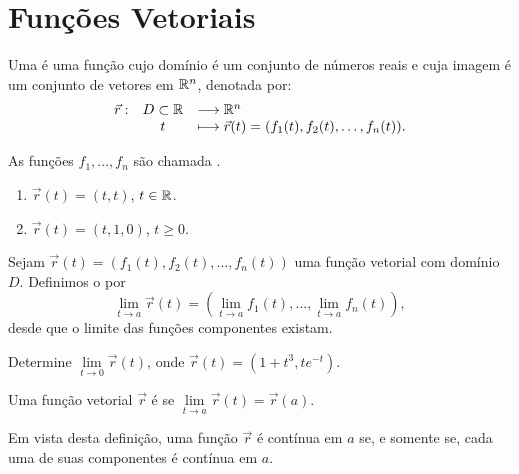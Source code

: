 \section{Funções Vetoriais}

\begin{definb}{}{}
Uma  é uma função cujo domínio é um conjunto de números reais e cuja imagem é um conjunto de vetores em $\mathbb{R}^n$, denotada por:
\[\begin{array}{lcl}
\vec{r}: & D\subset \mathbb{R} &  \longrightarrow \mathbb{R}^n\\
         & t           & \longmapsto \vec{r}(t)=(f_1(t),f_2(t),\ldots,f_n(t)).
\end{array}\]

As funções $f_1,\ldots,f_n$ são chamada .
\end{definb}

\begin{exeb}{}{}
\begin{enumerate}
\item $\vec{r}(t)=(t,t)$, $t\in \mathbb{R}$.
\item $\vec{r}(t)=(t,1,0)$, $t\geq 0$.
\end{enumerate}
\end{exeb}
\newpage



\begin{definb}{}{}
Sejam $\vec{r}(t)=(f_1(t),f_2(t),\ldots,f_n(t))$ uma função vetorial com domínio $D$. Definimos o  por
\[\lim\limits_{t\to a}\vec{r}(t)=\left(\lim\limits_{t\to a}f_1(t),\ldots,\lim\limits_{t\to a}f_n(t)\right), \]
desde que o limite das funções componentes existam.
\end{definb}

\begin{exeb}{}{}
Determine $\lim\limits_{t\to 0}\vec{r}(t)$, onde $\vec{r}(t)=(1+t^3, te^{-t})$.
\end{exeb}
\vfill


\begin{definb}{}{}
Uma função vetorial $\vec{r}$ é  se $\lim\limits_{t\to a}\vec{r}(t)=\vec{r}(a)$.
\end{definb}
Em vista desta definição, uma função $\vec{r}$ é {\color{blue}contínua em $a$} se, e somente se, cada uma de suas {\color{blue}componentes é contínua em $a$}.


\newpage



